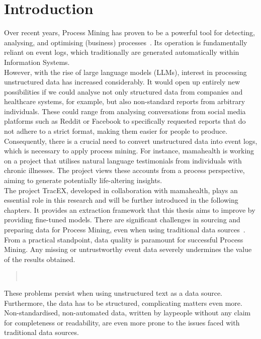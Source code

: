\section{Introduction}\label{sec:intro}
Over recent years, Process Mining has proven to be a powerful tool for detecting, analysing, and optimising (business) processes~\cite{weske_business_2012}. Its operation is fundamentally reliant on event logs, which traditionally are generated automatically within Information Systems.\\
However, with the rise of large language models (LLMs), interest in processing unstructured data has increased considerably. It would open up entirely new possibilities if we could analyse not only structured data from companies and healthcare systems, for example, but also non-standard reports from arbitrary individuals. These could range from analysing conversations from social media platforms such as Reddit or Facebook to specifically requested reports that do not adhere to a strict format, making them easier for people to produce.\\
Consequently, there is a crucial need to convert unstructured data into event logs, which is necessary to apply process mining.
For instance, mamahealth is working on a project that utilises natural language testimonials from individuals with chronic illnesses. The project views these accounts from a process perspective, aiming to generate potentially life-altering insights.\\
The project TracEX, developed in collaboration with mamahealth, plays an essential role in this research and will be further introduced in the following chapters. It provides an extraction framework that this thesis aims to improve by providing fine-tuned models. There are significant challenges in sourcing and preparing data for Process Mining, even when using traditional data sources~\cite{van_der_aalst_process_2016}. From a practical standpoint, data quality is paramount for successful Process Mining. Any missing or untrustworthy event data severely undermines the value of the results obtained. 
\begin{quote}
    ~\cite{van_der_aalst_process_2016}    
\end{quote}
These problems persist when using unstructured text as a data source. Furthermore, the data has to be structured, complicating matters even more. Non-standardised, non-automated data, written by laypeople without any claim for completeness or readability, are even more prone to the issues faced with traditional data sources.\\
